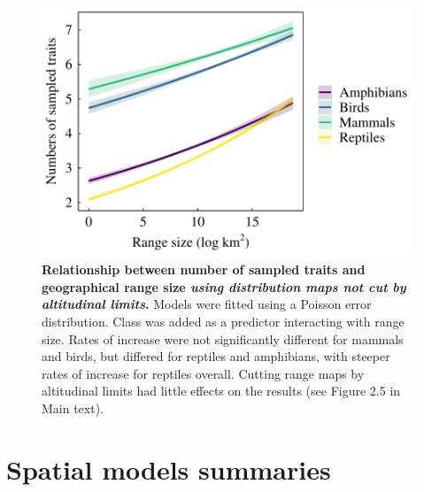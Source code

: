 \begin{figure}[h!]
\centering
\includegraphics[scale=0.7]{Supporting/Chapter2/Figures/Plot_BeforeCuttingRS}
\caption[Relationship between number of sampled traits and geographical range size using distribution maps not cut by altitudina limits.]{\textbf{Relationship between number of sampled traits and geographical range size \textit{using distribution maps not cut by altitudinal limits}.} Models were fitted using a Poisson error distribution. Class was added as a predictor interacting with range size. Rates of increase were not significantly different for mammals and birds, but differed for reptiles and amphibians, with steeper rates of increase for reptiles overall. Cutting range maps by altitudinal limits had little effects on the results (see Figure 2.5 in Main text).} 
\label{SI2_plot_RS_notcut}
\end{figure}


\newpage
\pagebreak
\clearpage



\section{Spatial models summaries}

